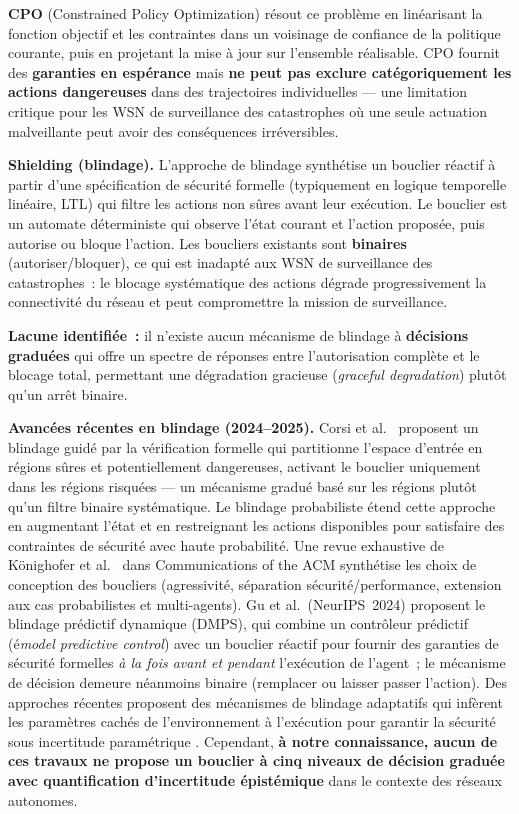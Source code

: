\textbf{CPO} (Constrained Policy Optimization) \cite{achiam2017cpo} résout ce problème en linéarisant la fonction objectif et les contraintes dans un voisinage de confiance de la politique courante, puis en projetant la mise à jour sur l'ensemble réalisable. CPO fournit des \textbf{garanties en espérance} mais \textbf{ne peut pas exclure catégoriquement les actions dangereuses} dans des trajectoires individuelles --- une limitation critique pour les WSN de surveillance des catastrophes où une seule actuation malveillante peut avoir des conséquences irréversibles.

\textbf{Shielding (blindage).} L'approche de blindage \cite{alshiekh2018shielding} synthétise un bouclier réactif à partir d'une spécification de sécurité formelle (typiquement en logique temporelle linéaire, LTL) qui filtre les actions non sûres avant leur exécution. Le bouclier est un automate déterministe qui observe l'état courant et l'action proposée, puis autorise ou bloque l'action. Les boucliers existants sont \textbf{binaires} (autoriser/bloquer), ce qui est inadapté aux WSN de surveillance des catastrophes~: le blocage systématique des actions dégrade progressivement la connectivité du réseau et peut compromettre la mission de surveillance.

\textbf{Lacune identifiée~:} il n'existe aucun mécanisme de blindage à \textbf{décisions graduées} qui offre un spectre de réponses entre l'autorisation complète et le blocage total, permettant une dégradation gracieuse (\emph{graceful degradation}) plutôt qu'un arrêt binaire.

\textbf{Avancées récentes en blindage (2024--2025).} Corsi et al.\ \cite{corsi2024verification} proposent un blindage guidé par la vérification formelle qui partitionne l'espace d'entrée en régions sûres et potentiellement dangereuses, activant le bouclier uniquement dans les régions risquées --- un mécanisme gradué basé sur les régions plutôt qu'un filtre binaire systématique. Le blindage probabiliste \cite{corsi2025prob_shielding} étend cette approche en augmentant l'état et en restreignant les actions disponibles pour satisfaire des contraintes de sécurité avec haute probabilité. Une revue exhaustive de Könighofer et al.\ \cite{pranger2025shields} dans Communications of the ACM synthétise les choix de conception des boucliers (agressivité, séparation sécurité/performance, extension aux cas probabilistes et multi-agents). Gu et al.\ (NeurIPS~2024) \cite{dmps_shielding2024} proposent le blindage prédictif dynamique (DMPS), qui combine un contrôleur prédictif (é\emph{model predictive control}) avec un bouclier réactif pour fournir des garanties de sécurité formelles \emph{à la fois avant et pendant} l'exécution de l'agent~; le mécanisme de décision demeure néanmoins binaire (remplacer ou laisser passer l'action). Des approches récentes proposent des mécanismes de blindage adaptatifs qui infèrent les paramètres cachés de l'environnement à l'exécution pour garantir la sécurité sous incertitude paramétrique \cite{adaptive_shielding_iclr2026}. Cependant, \textbf{à notre connaissance, aucun de ces travaux ne propose un bouclier à cinq niveaux de décision graduée avec quantification d'incertitude épistémique} dans le contexte des réseaux autonomes.

